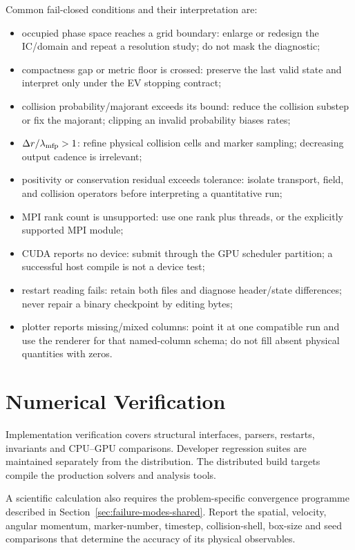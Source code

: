 Common fail-closed conditions and their interpretation are:
\begin{itemize}
\item occupied phase space reaches a grid boundary: enlarge or redesign the
IC/domain and repeat a resolution study; do not mask the diagnostic;
\item compactness gap or metric floor is crossed: preserve the last valid
state and interpret only under the EV stopping contract;
\item collision probability/majorant exceeds its bound: reduce the collision
substep or fix the majorant; clipping an invalid probability biases rates;
\item \(\Delta r/\lambda_{\rm mfp}>1\): refine physical collision cells and
marker sampling; decreasing output cadence is irrelevant;
\item positivity or conservation residual exceeds tolerance: isolate
transport, field, and collision operators before interpreting a quantitative
run;
\item MPI rank count is unsupported: use one rank plus threads, or the
explicitly supported MPI module;
\item CUDA reports no device: submit through the GPU scheduler partition; a
successful host compile is not a device test;
\item restart reading fails: retain both files and diagnose header/state
differences; never repair a binary checkpoint by editing bytes;
\item plotter reports missing/mixed columns: point it at one compatible run
and use the renderer for that named-column schema; do not fill absent physical
quantities with zeros.
\end{itemize}

\section{Numerical Verification}
\label{app:developer-verification}

Implementation verification covers structural interfaces, parsers, restarts,
invariants and CPU--GPU comparisons. Developer regression suites are
maintained separately from the distribution. The distributed build targets
compile the production solvers and analysis tools.

A scientific calculation also requires the problem-specific convergence
programme described in Section~\ref{sec:failure-modes-shared}. Report the
spatial, velocity, angular momentum, marker-number, timestep, collision-shell,
box-size and seed comparisons that determine the accuracy of its physical
observables.
